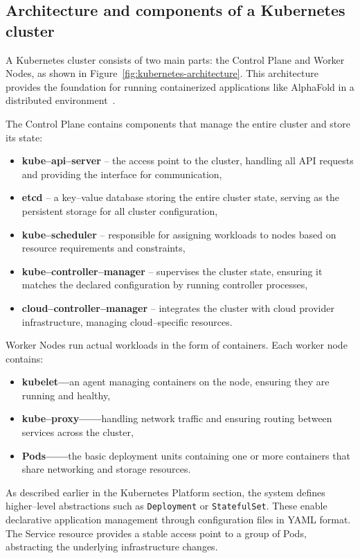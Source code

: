 \subsection{Architecture and components of a Kubernetes cluster}

A Kubernetes cluster consists of two main parts: the Control Plane and Worker Nodes, as shown in Figure~\ref{fig:kubernetes-architecture}.
This architecture provides the foundation for running containerized applications like AlphaFold in a distributed environment~\cite{kubernetes}.

The Control Plane contains components that manage the entire cluster and store its state:
\begin{itemize}
    \item \textbf{kube--api--server} -- the access point to the cluster, handling all API requests and providing the interface for communication,
    \item \textbf{etcd} -- a key--value database storing the entire cluster state, serving as the persistent storage for all cluster configuration,
    \item \textbf{kube--scheduler} -- responsible for assigning workloads to nodes based on resource requirements and constraints,
    \item \textbf{kube--controller--manager} -- supervises the cluster state, ensuring it matches the declared configuration by running controller processes,
    \item \textbf{cloud--controller--manager} -- integrates the cluster with cloud provider infrastructure, managing cloud--specific resources.
\end{itemize}

Worker Nodes run actual workloads in the form of containers.
Each worker node contains:
\begin{itemize}
    \item \textbf{kubelet—}an agent managing containers on the node, ensuring they are running and healthy,
    \item \textbf{kube--proxy——}handling network traffic and ensuring routing between services across the cluster,
    \item \textbf{Pods——}the basic deployment units containing one or more containers that share networking and storage resources.
\end{itemize}

As described earlier in the Kubernetes Platform section, the system defines higher--level abstractions such as \texttt{Deployment} or \texttt{StatefulSet}.
These enable declarative application management through configuration files in YAML format.
The Service resource provides a stable access point to a group of Pods, abstracting the underlying infrastructure changes.

